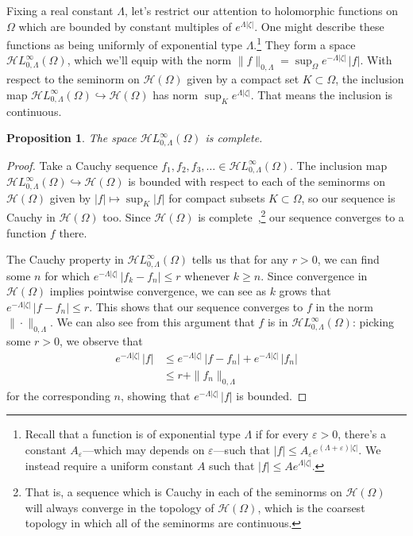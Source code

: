 \documentclass{article}
\theoremstyle{definition}
\theoremstyle{plain}
\newtheorem{prop}{Proposition}
\newcommand{\holo}{\mathcal{H}}
\newcommand{\singexp}[2]{\mathcal{H}L^\infty_{#1, #2}}
\newcommand{\domain}{\Omega}
\begin{document}
Fixing a real constant $\Lambda$, let's restrict our attention to holomorphic functions on $\domain$ which are bounded by constant multiples of $e^{\Lambda|\zeta|}$. One might describe these functions as being uniformly of exponential type $\Lambda$.\footnote{Recall that a function is of exponential type $\Lambda$ if for every $\varepsilon>0$, there's a constant $A_\varepsilon$---which may depends on $\varepsilon$---such that $|f|\le A_\varepsilon e^{(\Lambda+\varepsilon)|\zeta|}$. We instead require a uniform constant $A$ such that $|f| \le A e^{\Lambda|\zeta|}$.} They form a space $\singexp{0}{\Lambda}(\domain)$, which we'll equip with the norm $\|f\|_{0,\Lambda} = \sup_\domain e^{-\Lambda|\zeta|}\,|f|$. With respect to the seminorm on $\holo(\domain)$ given by a compact set $K \subset \domain$, the inclusion map $\singexp{0}{\Lambda}(\domain) \hookrightarrow \holo(\domain)$ has norm $\sup_K e^{\Lambda |\zeta|}$. That means the inclusion is continuous.
\begin{prop}\label{exp-complete}
The space $\singexp{0}{\Lambda}(\domain)$ is complete.
\end{prop}
\begin{proof}
Take a Cauchy sequence $f_1, f_2, f_3, \ldots \in \singexp{0}{\Lambda}(\Omega)$. The inclusion map $\singexp{0}{\Lambda}(\Omega) \hookrightarrow \holo(\Omega)$ is bounded with respect to each of the seminorms on $\holo(\Omega)$ given by $|f| \mapsto \sup_K |f|$ for compact subsets $K \subset \Omega$, so our sequence is Cauchy in $\holo(\Omega)$ too. Since $\holo(\Omega)$ is complete~\cite[Proposition~3.5]{fnl-cpx-anal},\footnote{That is, a sequence which is Cauchy in each of the seminorms on $\holo(\Omega)$ will always converge in the topology of $\holo(\Omega)$, which is the coarsest topology in which all of the seminorms are continuous.} our sequence converges to a function $f$ there.

The Cauchy property in $\singexp{0}{\Lambda}(\Omega)$ tells us that for any $r > 0$, we can find some $n$ for which $e^{-\Lambda |\zeta|}\,|f_k - f_n| \le r$ whenever $k \ge n$. Since convergence in $\holo(\Omega)$ implies pointwise convergence, we can see as $k$ grows that $e^{-\Lambda |\zeta|}\,|f - f_n| \le r$. This shows that our sequence converges to $f$ in the norm $\|\cdot\|_{0,\Lambda}$. We can also see from this argument that $f$ is in $\singexp{0}{\Lambda}(\domain)$: picking some $r > 0$, we observe that
\begin{align*}
e^{-\Lambda |\zeta|}\,|f| & \le e^{-\Lambda |\zeta|}\,|f - f_n| + e^{-\Lambda |\zeta|}\,|f_n| \\
& \le r + \|f_n\|_{0,\Lambda}
\end{align*}
for the corresponding $n$, showing that $e^{-\Lambda |\zeta|}\,|f|$ is bounded.
\end{proof}
\end{document}
